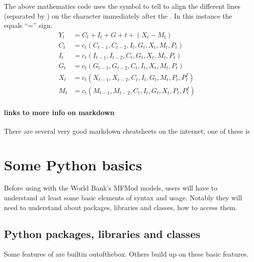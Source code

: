 \documentclass[letterpaper,10pt,english]{jupyterBook}
\begin{document}
\sphinxAtStartPar
The above  mathematics code uses the  \sphinxcode{\sphinxupquote{\&}} symbol to tell  to align the different lines (separated by \sphinxcode{\sphinxupquote{\textbackslash{}\textbackslash{}}}) on the character immediately after the \sphinxcode{\sphinxupquote{\&}}. In this instance the equals “=” sign.
\begin{align*}
Y_t  &=  C_t+I_t+G+t+ (X_t-M_t) \\
C_t &= c_t(C_{t-1},C_{t-2},I_t,G_t,X_t,M_t,P_t)\\
I_t &= c_t(I_{t-1},I_{t-2},C_t,G_t,X_t,M_t,P_t)\\
G_t &= c_t(G_{t-1},G_{t-2},C_t,I_t,X_t,M_t,P_t)\\
X_t &= c_t(X_{t-1},X_{t-2},C_t,I_t,G_t,M_t,P_t,P^f_t)\\
M_t &= c_t(M_{t-1},M_{t-2},C_t,I_t,G_t,X_t,P_t,P^f_t)
\end{align*}

\subsubsection{links to more info on markdown}
\label{\detokenize{content/04_PythonEssentials/Intro_Jupyter_notebook:links-to-more-info-on-markdown}}
\sphinxAtStartPar
There are several very good markdown cheatsheets on the internet, one of these is 

\sphinxstepscope


\chapter{Some Python basics}
\label{\detokenize{content/04_PythonEssentials/PythonPandasDataframes:some-python-basics}}\label{\detokenize{content/04_PythonEssentials/PythonPandasDataframes::doc}}
\sphinxAtStartPar
Before using  with the World Bank’s MFMod models, users  will have to understand at least some basic elements of  syntax and usage.  Notably they will need to understand about packages, libraries and classes, how to access them.


\section{Python  packages, libraries and classes}
\label{\detokenize{content/04_PythonEssentials/PythonPandasDataframes:python-packages-libraries-and-classes}}
\sphinxAtStartPar
Some features of  are built\sphinxhyphen{}in out\sphinxhyphen{}of\sphinxhyphen{}the\sphinxhyphen{}box.  Others build up on these basic features.
\end{document}
